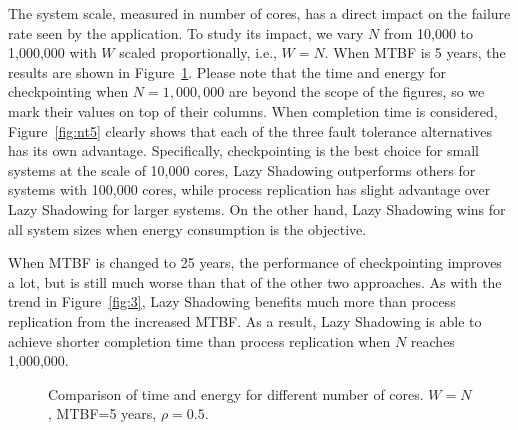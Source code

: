 The system scale, measured in number of cores, has a direct impact on the failure rate seen by the application. To study its impact, we vary $N$ from 10,000 to 1,000,000 with $W$ scaled proportionally, i.e., $W=N$. When MTBF is 5 years, the results are shown in Figure~\ref{fig:n5}. Please note that the time and energy for checkpointing when $N=1,000,000$ are beyond the scope of the figures, so we mark their values on top of their columns. When completion time is considered, Figure~\ref{fig:nt5} clearly shows that each of the three fault tolerance alternatives has its own advantage. Specifically, checkpointing is the best choice for small systems at the scale of 10,000 cores, Lazy Shadowing outperforms others for systems with 100,000 cores, while process replication has slight advantage over Lazy Shadowing for larger systems. On the other hand, Lazy Shadowing wins for all system sizes when energy consumption is the objective. 

When MTBF is changed to 25 years, the performance of checkpointing improves a lot, but is still much worse than that of the other two approaches. As with the trend in Figure~\ref{fig:3}, Lazy Shadowing benefits much more than process replication from the increased MTBF. As a result, Lazy Shadowing is able to achieve shorter completion time than process replication when $N$ reaches 1,000,000.

\begin{figure}[!t]
	\captionsetup{justification=centering}
	\begin{center}
	\end{center}
	\caption{Comparison of time and energy for different number of cores. $W=N$, MTBF=5 years, $\rho=0.5$.}
	\label{fig:n5}
\end{figure}

